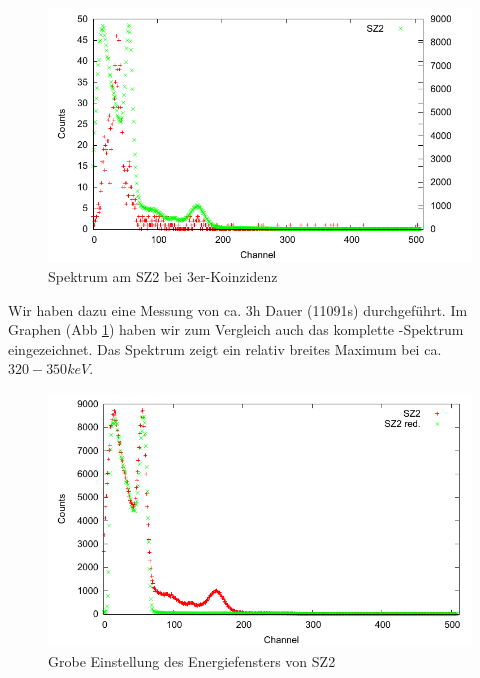 
\begin{figure}
 \includegraphics[width=\textwidth]{Graphen/3er/spektrum-2.pdf}
 \caption{Spektrum am SZ2 bei 3er-Koinzidenz}
 \label{graphen-3er-spektrum-2}
\end{figure}

Wir haben dazu eine Messung von ca. 3h Dauer (11091s) durchgeführt. Im Graphen (Abb \ref{graphen-3er-spektrum-2}) haben wir zum Vergleich auch das komplette \Na-Spektrum eingezeichnet. Das Spektrum zeigt ein relativ breites Maximum bei ca. $320-350 keV$.


\begin{figure}
 \includegraphics[width=\textwidth]{Graphen/3er/red-spektrum-sz2.pdf}
 \caption{Grobe Einstellung des Energiefensters von SZ2}
 \label{graphen-3er-red-spektrum-sz2}
\end{figure}

